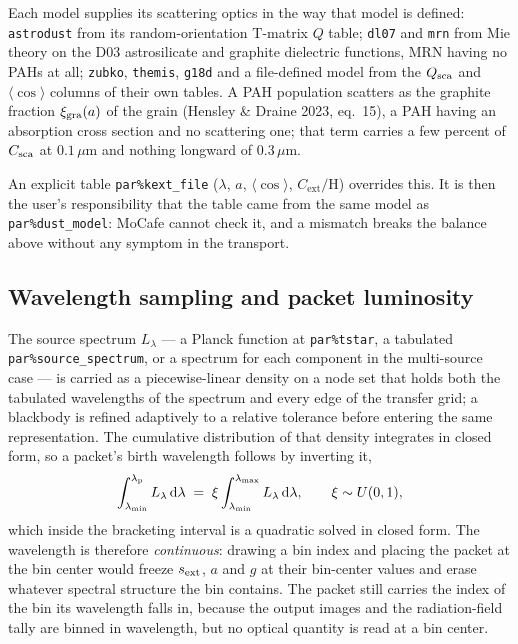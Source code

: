 \documentclass[english,a4paper]{kiseon_memo}
\newcommand{\Cext}{C_{\mathrm{ext}}}
\newcommand{\pp}[1]{\texttt{par\%#1}}
\begin{document}
Each model supplies its scattering optics in the way that model is defined:
\texttt{astrodust} from its random-orientation T-matrix $Q$ table; \texttt{dl07}
and \texttt{mrn} from Mie theory on the D03 astrosilicate and graphite
dielectric functions, MRN having no PAHs at all; \texttt{zubko},
\texttt{themis}, \texttt{g18d} and a file-defined model from the $Q_{\rm sca}$
and $\langle\cos\rangle$ columns of their own tables.  A PAH population scatters as the graphite fraction
$\xi_{\rm gra}(a)$ of the grain (Hensley \& Draine 2023, eq.~15), a PAH having
an absorption cross section and no scattering one; that term carries a few
percent of $C_{\rm sca}$ at $0.1\,\mu$m and nothing longward of
$0.3\,\mu$m.

An explicit table \pp{kext\_file} ($\lambda$, $a$, $\langle\cos\rangle$,
$\Cext/$H) overrides this.  It is then the user's responsibility that the table
came from the same model as \pp{dust\_model}: MoCafe cannot check it, and a
mismatch breaks the balance above without any symptom in the transport.

\subsection{Wavelength sampling and packet luminosity}\label{sec:wavesamp}
The source spectrum $L_\lambda$ --- a Planck function at \pp{tstar}, a tabulated
\pp{source\_spectrum}, or a spectrum for each component in the multi-source case
--- is carried as a piecewise-linear density on a node set that holds both the
tabulated wavelengths of the spectrum and every edge of the transfer grid; a
blackbody is refined adaptively to a relative tolerance before entering the same
representation.  The cumulative distribution of that density integrates in closed
form, so a packet's birth wavelength follows by inverting it,
\begin{equation}
  \int_{\lambda_{\min}}^{\lambda_{\rm p}} L_\lambda\,{\rm d}\lambda
  \;=\; \xi \int_{\lambda_{\min}}^{\lambda_{\max}} L_\lambda\,{\rm d}\lambda ,
  \qquad \xi \sim U(0,1),
  \label{eq:wavedraw}
\end{equation}
which inside the bracketing interval is a quadratic solved in closed form.  The
wavelength is therefore \emph{continuous}: drawing a bin index and placing the
packet at the bin center would freeze $s_{\rm ext}$, $a$ and $g$ at their
bin-center values and erase whatever spectral structure the bin contains.  The
packet still carries the index of the bin its wavelength falls in, because the
output images and the radiation-field tally are binned in wavelength, but no
optical quantity is read at a bin center.
\end{document}
